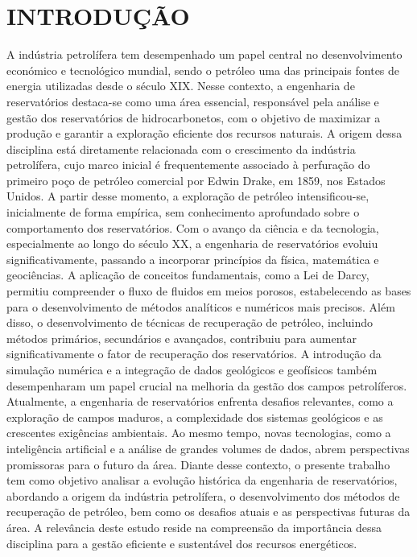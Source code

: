 \documentclass[12pt,a4paper]{report}
\begin{document}
\chapter{INTRODUÇÃO}
A indústria petrolífera tem desempenhado um papel central no desenvolvimento económico e tecnológico mundial, sendo o petróleo uma das principais fontes de energia utilizadas desde o século XIX. Nesse contexto, a engenharia de reservatórios destaca-se como uma área essencial, responsável pela análise e gestão dos reservatórios de hidrocarbonetos, com o objetivo de maximizar a produção e garantir a exploração eficiente dos recursos naturais.
A origem dessa disciplina está diretamente relacionada com o crescimento da indústria petrolífera, cujo marco inicial é frequentemente associado à perfuração do primeiro poço de petróleo comercial por Edwin Drake, em 1859, nos Estados Unidos. A partir desse momento, a exploração de petróleo intensificou-se, inicialmente de forma empírica, sem conhecimento aprofundado sobre o comportamento dos reservatórios.
Com o avanço da ciência e da tecnologia, especialmente ao longo do século XX, a engenharia de reservatórios evoluiu significativamente, passando a incorporar princípios da física, matemática e geociências. A aplicação de conceitos fundamentais, como a Lei de Darcy, permitiu compreender o fluxo de fluidos em meios porosos, estabelecendo as bases para o desenvolvimento de métodos analíticos e numéricos mais precisos.
Além disso, o desenvolvimento de técnicas de recuperação de petróleo, incluindo métodos primários, secundários e avançados, contribuiu para aumentar significativamente o fator de recuperação dos reservatórios. A introdução da simulação numérica e a integração de dados geológicos e geofísicos também desempenharam um papel crucial na melhoria da gestão dos campos petrolíferos.
Atualmente, a engenharia de reservatórios enfrenta desafios relevantes, como a exploração de campos maduros, a complexidade dos sistemas geológicos e as crescentes exigências ambientais. Ao mesmo tempo, novas tecnologias, como a inteligência artificial e a análise de grandes volumes de dados, abrem perspectivas promissoras para o futuro da área.
Diante desse contexto, o presente trabalho tem como objetivo analisar a evolução histórica da engenharia de reservatórios, abordando a origem da indústria petrolífera, o desenvolvimento dos métodos de recuperação de petróleo, bem como os desafios atuais e as perspectivas futuras da área. A relevância deste estudo reside na compreensão da importância dessa disciplina para a gestão eficiente e sustentável dos recursos energéticos.
\end{document}
